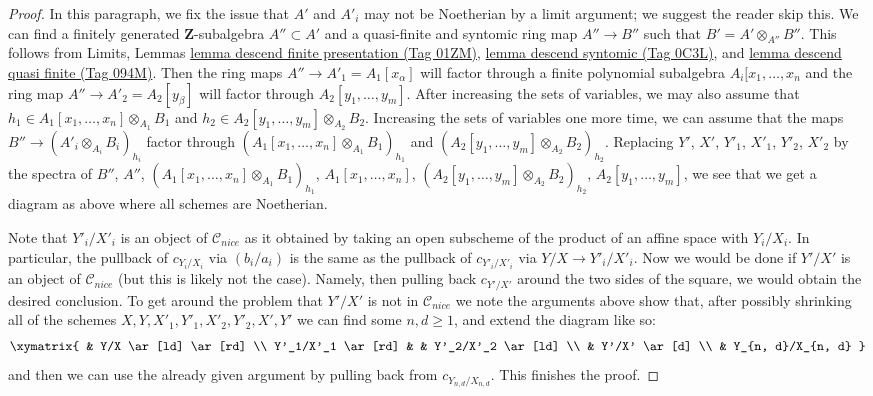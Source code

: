 \documentclass{amsart}
\theoremstyle{plain}
\theoremstyle{definition}
\theoremstyle{remark}
\numberwithin{equation}{subsection}
\begin{document}
\begin{proof}
\medskip\noindent
In this paragraph, we fix the issue that $A'$ and $A'_i$ may not be Noetherian
by a limit argument; we suggest the reader skip this.
We can find a finitely generated $\mathbf{Z}$-subalgebra
$A'' \subset A'$ and a quasi-finite and syntomic ring map
$A'' \to B''$ such that $B' = A' \otimes_{A''} B''$.
This follows from Limits, Lemmas
\href{https://stacks.math.columbia.edu/tag/01ZM}{lemma descend finite presentation (Tag 01ZM)},
\href{https://stacks.math.columbia.edu/tag/0C3L}{lemma descend syntomic (Tag 0C3L)}, and
\href{https://stacks.math.columbia.edu/tag/094M}{lemma descend quasi finite (Tag 094M)}.
Then the ring maps $A'' \to A'_1 = A_1[x_\alpha]$ will factor through a finite
polynomial subalgebra $A_i[x_1, \ldots, x_n$ and the ring map
$A'' \to A'_2 = A_2[y_\beta]$ will factor through $A_2[y_1, \ldots, y_m]$.
After increasing the sets of variables, we may also assume that
$h_1 \in A_1[x_1, \ldots, x_n] \otimes_{A_1} B_1$ and
$h_2 \in A_2[y_1, \ldots, y_m] \otimes_{A_2} B_2$.
Increasing the sets of variables one more time, we can assume
that the maps $B'' \to (A'_i \otimes_{A_i} B_i)_{h_i}$
factor through $(A_1[x_1, \ldots, x_n] \otimes_{A_1} B_1)_{h_1}$
and $(A_2[y_1, \ldots, y_m] \otimes_{A_2} B_2)_{h_2}$.
Replacing $Y'$, $X'$, $Y'_1$, $X'_1$, $Y'_2$, $X'_2$ by the spectra of
$B''$, $A''$, $(A_1[x_1, \ldots, x_n] \otimes_{A_1} B_1)_{h_1}$,
$A_1[x_1, \ldots, x_n]$, $(A_2[y_1, \ldots, y_m] \otimes_{A_2} B_2)_{h_2}$,
$A_2[y_1, \ldots, y_m]$, we see that we get a diagram as above
where all schemes are Noetherian.

\medskip\noindent
Note that $Y'_i/X'_i$ is an object of $\mathcal{C}_{nice}$ as it
obtained by taking an open subscheme of the product of an affine space
with $Y_i/X_i$. In particular, the pullback of
$c_{Y_i/X_i}$ via $(b_i/a_i)$ is the same as the pullback of
$c_{Y'_i/X'_i}$ via $Y/X \to Y'_i/X'_i$.
Now we would be done if $Y'/X'$ is an object of $\mathcal{C}_{nice}$
(but this is likely not the case). Namely, then pulling back $c_{Y'/X'}$
around the two sides of the square, we would obtain the desired conclusion.
To get around the problem that $Y'/X'$ is not in $\mathcal{C}_{nice}$
we note the arguments above show that, after possibly shrinking all
of the schemes $X, Y, X'_1, Y'_1, X'_2, Y'_2, X', Y'$ we can find some
$n, d \geq 1$, and extend the diagram like so:
$$
\xymatrix{
& Y/X \ar[ld] \ar[rd] \\
Y'_1/X'_1 \ar[rd] & & Y'_2/X'_2 \ar[ld] \\
& Y'/X' \ar[d] \\
& Y_{n, d}/X_{n, d}
}
$$
and then we can use the already given argument by pulling
back from $c_{Y_{n, d}/X_{n, d}}$. This finishes the proof.
\end{proof}
\end{document}
